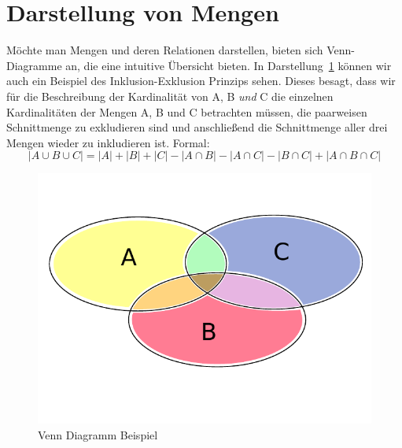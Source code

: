 \section{Darstellung von Mengen}
%
Möchte man Mengen und deren Relationen darstellen, bieten sich Venn-Diagramme an,
die eine intuitive Übersicht bieten. In Darstellung~\ref{fig:venn_diagram} können
wir auch ein Beispiel des Inklusion-Exklusion Prinzips sehen. Dieses besagt, dass
wir für die Beschreibung der Kardinalität von A, B \emph{und} C die einzelnen Kardinalitäten
der Mengen A, B und C betrachten müssen, die paarweisen Schnittmenge zu exkludieren
sind und anschließend die Schnittmenge aller drei Mengen wieder zu inkludieren ist.
Formal:
\[
    |A \cup B \cup C| = |A| + |B| + |C| - |A \cap B| - |A \cap C|
        - |B \cap C| + |A \cap B \cap C|
\]
%
\begin{figure}[p]
 \begin{center}
  \includegraphics{img/venn_diagram_example.pdf}
  \caption{Venn Diagramm Beispiel}
  \label{fig:venn_diagram}
 \end{center}
\end{figure}

